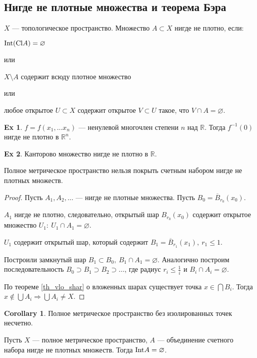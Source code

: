 \documentclass[11pt]{book}
\newcommand{\R}{\mathbb{R}}
\newcommand{\Cl}{{\mathop{\text{\rm Cl}}}}
\newcommand{\Int}{{\mathop{\text{\rm Int}}}}
\renewcommand{\le}{\leqslant}
\theoremstyle{definition}
\theoremstyle{plain}
\theoremstyle{plain}
\theoremstyle{definition}
\newtheorem*{ex}{Ex}
\newtheorem*{cor}{Corollary}
\theoremstyle{remark}
\begin{document}
\subsection{Нигде не плотные множества и теорема Бэра}
\begin{defn}
    $ X$ ---  топологическое пространство. Множество $ A \subset X$ {\sf нигде не плотно}, если:
    \begin{description}
	\item $ \Int (\Cl A) = \varnothing$
    \end{description}
    или
    \begin{description}
	\item $X \setminus A$ содержит всюду плотное множество
    \end{description}
    или
    \begin{description}
	\item любое открытое $ U \subset X$ содержит  открытое $ V \subset U$ такое, что $ V \cap A = \varnothing$.
    \end{description}
\end{defn}
\begin{ex}
    $ f = f(x_1, \ldots x_n)$ --- ненулевой многочлен степени $ n$ над  $ \R$. Тогда  $ f^{-1}(0)$ нигде не плотно в $ \R^{n} $.
\end{ex}
\begin{ex}
    Канторово множество нигде не плотно в $ \R$.
\end{ex}
\begin{thm}[Бэр]
    Полное метрическое пространство нельзя покрыть счетным набором нигде не плотных множеств.
\end{thm}
\begin{proof}
    Пусть $ A_1, A_2, \ldots $ --- нигде не плотные множества.
    Пусть $ B_0 = \overline{B}_{r_0}(x_0)$.

    $ A_1$ нигде не плотно, следовательно, открытый шар $ B_{r_0}(x_0)$ содержит открытое множество $ U_1: ~ U_1 \cap A_1 = \varnothing$.

    $ U_1$ содержит открытый шар, который содержит $ B_1 = \overline{B}_{r_1}(x_1), ~ r_1 \le  1$.

    Построили замкнутый шар $ B_1 \subset B_0, ~ B_1 \cap A_1 = \varnothing$.
    Аналогично построим последовательность $ B_0 \supset B_1 \supset B_2 \supset \ldots $, где радиус $  r_i \le \frac{1}{i}$ и $ B_i \cap A_i = \varnothing$.

    По теореме \ref{th_vlo_shar} о вложенных шарах существует точка $ x \in  \bigcap B_i $. Тогда $ x \not\in \bigcup A_i  \Longrightarrow  \bigcup A_i \ne X$.
\end{proof}
\begin{cor}
    Полное метрическое пространство без изолированных точек несчетно.
\end{cor}
\begin{thm}
    Пусть $ X$ --- полное метрическое пространство,  $ A$ --- объединение счетного набора нигде не плотных множеств. Тогда  $ \Int A = \varnothing$.
\end{thm}
\end{document}
